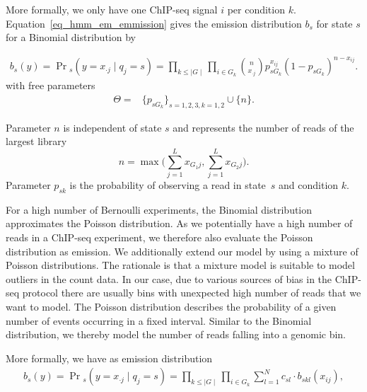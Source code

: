 More formally, we only have one ChIP-seq signal $i$ per condition $k$.
Equation~\ref{eq_hmm_em_emmission} gives the emission distribution $b_s$ for state $s$ for a Binomial distribution by

\begin{align}
 b_s(y) = \Pr\textstyle_{s}(y = x_{\cdot j} \mid q_j = s)= \prod_{k \leq \mid G \mid} \prod_{i \in G_k} {n \choose x_{\cdot j} }p_{sG_k}^{x_{ij}}(1-p_{sG_k})^{n-x_{ij}}. \label{eq_hmm_bin_emission}
\end{align}
\noindent
with free parameters
\begin{align*}
 \Theta =& \{p_{sG_k}\}_{s = 1,2,3, k = 1,2} \cup \{n\}.
\end{align*}

\noindent
Parameter $n$ is independent of state $s$ and represents the number of reads of the largest library $$n=\max\Bigg(\sum_{j=1}^{L} x_{G_1j}, \sum_{j=1}^{L} x_{G_2j}\Bigg).$$ 
Parameter $p_{sk}$ is the probability of observing a read in state~$s$ and condition $k$.

For a high number of Bernoulli experiments, the Binomial distribution approximates the Poisson distribution.
As we potentially have a high number of reads in a ChIP-seq experiment, we therefore also evaluate the Poisson distribution as emission.
We additionally extend our model by using a mixture of Poisson distributions.
The rationale is that a mixture model is suitable to model outliers in the count data.
In our case, due to various sources of bias in the ChIP-seq protocol there are usually bins with unexpected high number of reads that we want to model.
The Poisson distribution describes the probability of a given number of events occurring in a fixed interval.
Similar to the Binomial distribution, we thereby model the number of reads falling into a genomic bin.

More formally, we have as emission distribution
\begin{align}
 b_s(y) = \Pr\textstyle_{s}(y = x_{\cdot j} \mid q_j = s)= \prod_{k \leq \mid G \mid} \prod_{i \in G_k} \sum_{l=1}^N c_{sl} \cdot b_{skl}(x_{ij}), \label{eq_hmm_poisson_emission}
\end{align}

